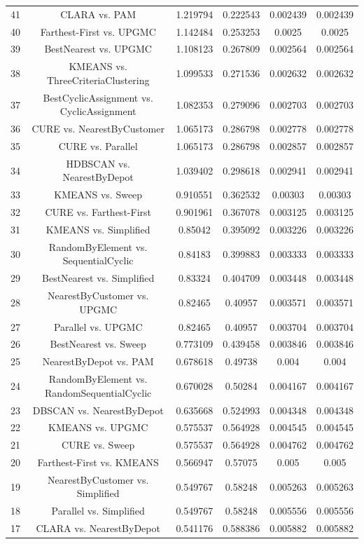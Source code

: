 \documentclass[a4paper,10pt]{article}
\begin{document}
\begin{landscape}
\begin{table}[!htp]
\begin{tabular}{cccccc}
41&CLARA vs. PAM&1.219794&0.222543&0.002439&0.002439\\
40&Farthest-First vs. UPGMC&1.142484&0.253253&0.0025&0.0025\\
39&BestNearest vs. UPGMC&1.108123&0.267809&0.002564&0.002564\\
38&KMEANS vs. ThreeCriteriaClustering&1.099533&0.271536&0.002632&0.002632\\
37&BestCyclicAssignment vs. CyclicAssignment&1.082353&0.279096&0.002703&0.002703\\
36&CURE vs. NearestByCustomer&1.065173&0.286798&0.002778&0.002778\\
35&CURE vs. Parallel&1.065173&0.286798&0.002857&0.002857\\
34&HDBSCAN vs. NearestByDepot&1.039402&0.298618&0.002941&0.002941\\
33&KMEANS vs. Sweep&0.910551&0.362532&0.00303&0.00303\\
32&CURE vs. Farthest-First&0.901961&0.367078&0.003125&0.003125\\
31&KMEANS vs. Simplified&0.85042&0.395092&0.003226&0.003226\\
30&RandomByElement vs. SequentialCyclic&0.84183&0.399883&0.003333&0.003333\\
29&BestNearest vs. Simplified&0.83324&0.404709&0.003448&0.003448\\
28&NearestByCustomer vs. UPGMC&0.82465&0.40957&0.003571&0.003571\\
27&Parallel vs. UPGMC&0.82465&0.40957&0.003704&0.003704\\
26&BestNearest vs. Sweep&0.773109&0.439458&0.003846&0.003846\\
25&NearestByDepot vs. PAM&0.678618&0.49738&0.004&0.004\\
24&RandomByElement vs. RandomSequentialCyclic&0.670028&0.50284&0.004167&0.004167\\
23&DBSCAN vs. NearestByDepot&0.635668&0.524993&0.004348&0.004348\\
22&KMEANS vs. UPGMC&0.575537&0.564928&0.004545&0.004545\\
21&CURE vs. Sweep&0.575537&0.564928&0.004762&0.004762\\
20&Farthest-First vs. KMEANS&0.566947&0.57075&0.005&0.005\\
19&NearestByCustomer vs. Simplified&0.549767&0.58248&0.005263&0.005263\\
18&Parallel vs. Simplified&0.549767&0.58248&0.005556&0.005556\\
17&CLARA vs. NearestByDepot&0.541176&0.588386&0.005882&0.005882\\

\end{tabular}
\end{table}
\end{landscape}
\end{document}
